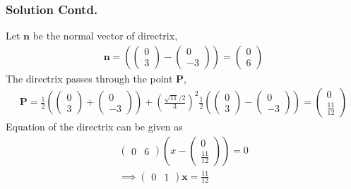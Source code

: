\documentclass{beamer}
\newcommand{\myvec}[1]{\ensuremath{\begin{pmatrix}#1\end{pmatrix}}}
\providecommand{\brak}[1]{\ensuremath{\left(#1\right)}}
\let\vec\mathbf
\renewcommand{\vec}[1]{\mathbf{#1}}
\begin{document}
\begin{frame}
\frametitle{Solution Contd.}
Let $\vec{n}$ be the normal vector of directrix,
\begin{align}
    \vec{n} = \brak{\myvec{0\\3}-\myvec{0\\-3}} =  \myvec{0\\6}
\end{align}
The directrix passes through the point $\vec{P}$,
\begin{align}
    \vec{P} = \frac{1}{2}\brak{\myvec{0\\3}+\myvec{0\\-3}}+
    \brak{\frac{\sqrt{11}/2}{3}}^2 \frac{1}{2}\brak{\myvec{0\\3}-\myvec{0\\-3}}= \myvec{0\\\frac{11}{12}}
\end{align}
Equation of the directrix can be given as
\begin{align}
    \myvec{0&6}\brak{x - \myvec{0\\\frac{11}{12}}} = 0\\
    \implies \myvec{0&1}\vec{x} = \frac{11}{12}
\end{align}
\end{frame}
\end{document}
